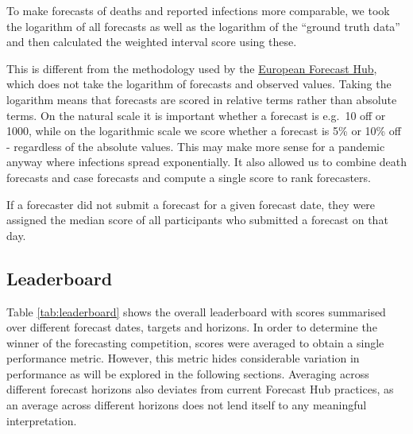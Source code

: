 \documentclass[
]{article}
\begin{document}
To make forecasts of deaths and reported infections more comparable, we took the logarithm of all forecasts as well as the logarithm of the ``ground truth data'' and then calculated the weighted interval score using these.

This is different from the methodology used by the \href{https://covid19forecasthub.eu/}{European Forecast Hub}, which does not take the logarithm of forecasts and observed values. Taking the logarithm means that forecasts are scored in relative terms rather than absolute terms. On the natural scale it is important whether a forecast is e.g.~10 off or 1000, while on the logarithmic scale we score whether a forecast is 5\% or 10\% off - regardless of the absolute values. This may make more sense for a pandemic anyway where infections spread exponentially. It also allowed us to combine death forecasts and case forecasts and compute a single score to rank forecasters.

If a forecaster did not submit a forecast for a given forecast date, they were assigned the median score of all participants who submitted a forecast on that day.

\hypertarget{leaderboard}{%
\subsection{Leaderboard}\label{leaderboard}}

Table \ref{tab:leaderboard} shows the overall leaderboard with scores summarised over different forecast dates, targets and horizons. In order to determine the winner of the forecasting competition, scores were averaged to obtain a single performance metric. However, this metric hides considerable variation in performance as will be explored in the following sections. Averaging across different forecast horizons also deviates from current Forecast Hub practices, as an average across different horizons does not lend itself to any meaningful interpretation.
\end{document}
